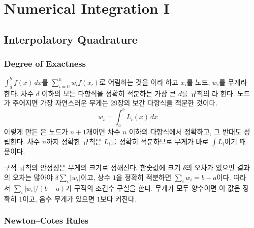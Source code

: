 \chapter{Numerical Integration I}
\label{ch:quadrature-1}


\section{Interpolatory Quadrature}
\label{sec:interpolatory-quadrature}

\subsection{Degree of Exactness}

$\int_a^bf(x)\,dx$를 $\sum_{i=0}^nw_if(x_i)$로 어림하는 것을 이라 하고 $x_i$를 노드, $w_i$를 무게라 한다. 차수 $d$ 이하의 모든 다항식을 정확히 적분하는 가장 큰 $d$를 규칙의 라 한다. 노드가 주어지면 가장 자연스러운 무게는 29장의 보간 다항식을 적분한 것이다.
\[
w_i=\int_a^bL_i(x)\,dx
\]
이렇게 만든 은 노드가 $n+1$개이면 차수 $n$ 이하의 다항식에서 정확하고, 그 반대도 성립한다. 차수 $n$까지 정확한 규칙은 $L_i$를 정확히 적분하므로 무게가 바로 $\int L_i$이기 때문이다.

구적 규칙의 안정성은 무게의 크기로 정해진다. 함숫값에 크기 $\delta$의 오차가 있으면 결과의 오차는 많아야 $\delta\sum_i|w_i|$이고, 상수 $1$을 정확히 적분하면 $\sum_iw_i=b-a$이다. 따라서 $\sum_i|w_i|/(b-a)$가 구적의 조건수 구실을 한다. 무게가 모두 양수이면 이 값은 정확히 $1$이고, 음수 무게가 있으면 $1$보다 커진다.

\subsection{Newton--Cotes Rules}

